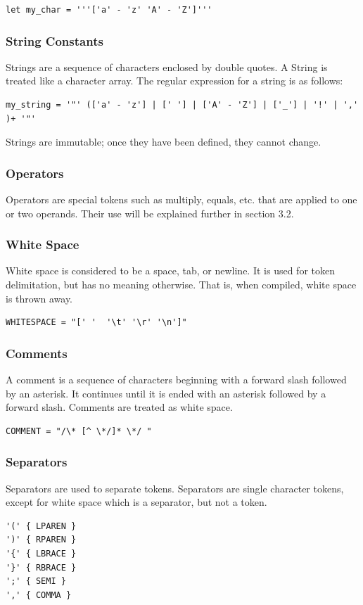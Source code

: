 \documentclass{article}
\begin{document}
\begin{Verbatim}[frame=single]
let my_char = '''['a' - 'z' 'A' - 'Z']''' 
\end{Verbatim}

\subsubsection{String Constants}
Strings are a sequence of characters enclosed by double quotes. A String is treated like a character array. The regular expression for a string is as follows:

\begin{Verbatim}[frame=single]
my_string = '"' (['a' - 'z'] | [' '] | ['A' - 'Z'] | ['_'] | '!' | ',' )+ '"'
\end{Verbatim}
Strings are immutable; once they have been defined, they cannot change.

\subsubsection{Operators}
Operators are special tokens such as multiply, equals, etc. that are applied to one or two operands.  Their use will be explained further in section 3.2.

\subsubsection{White Space}
White space is considered to be a space, tab, or newline. It is used for token delimitation, but has no meaning otherwise. That is, when compiled, white space is thrown away.

\begin{Verbatim}[frame=single]
WHITESPACE = "[' '  '\t' '\r' '\n']"
\end{Verbatim}

\subsubsection{Comments}
A comment is a sequence of characters beginning with a forward slash followed by an asterisk. It continues until it is ended with an asterisk followed by a forward slash. Comments are treated as white space. 
\begin{Verbatim}[frame=single]
COMMENT = "/\* [^ \*/]* \*/ "
\end{Verbatim}

\subsubsection{Separators}
Separators are used to separate tokens. Separators are single character tokens, except for white space which is a separator, but not a token. 
\begin{Verbatim}[frame=single]
'('	{ LPAREN }
')'	{ RPAREN }
'{'	{ LBRACE }
'}'	{ RBRACE }
';'	{ SEMI }
','	{ COMMA }
\end{Verbatim}
\end{document}
